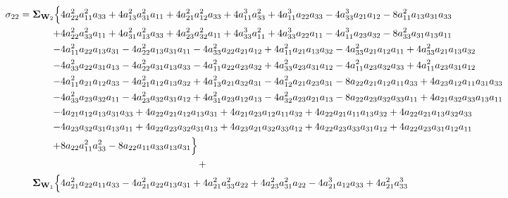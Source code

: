 \documentclass{article}
\begin{document}
\begin{equation}
\begin{aligned}
 \sigma_{22} =  \mathbf{\Sigma}_{\textbf{W}_{2}} \Bigl\{ & 4 a_{22}^{2} a_{11}^{2} a_{33} + 4 a_{13}^{2} a_{31}^{2} a_{11} + 4 a_{21}^{2} a_{12}^{2} a_{33} + 4 a_{11}^{3} a_{33}^{2} + 4 a_{11}^{3} a_{22} a_{33} - 4 a_{33}^{3} a_{21} a_{12} - 8 a_{11}^{2} a_{13} a_{31} a_{33} \\
+&4 a_{22}^{2} a_{33}^{2} a_{11} + 4 a_{31}^{2} a_{13}^{2} a_{33} + 4 a_{23}^{2} a_{32}^{2} a_{11} + 4 a_{33}^{3} a_{11}^{2} + 4 a_{33}^{3} a_{22} a_{11} - 4 a_{11}^{3} a_{23} a_{32} - 8 a_{33}^{2} a_{31} a_{13} a_{11} \\
-&4 a_{11}^{2} a_{22} a_{13} a_{31} - 4 a_{22}^{2} a_{13} a_{31} a_{11} - 4 a_{33}^{2} a_{22} a_{21} a_{12} + 4 a_{11}^{2} a_{21} a_{13} a_{32} - 4 a_{33}^{2} a_{21} a_{12} a_{11} + 4 a_{33}^{2} a_{21} a_{13} a_{32} \\
-&4 a_{33}^{2} a_{22} a_{31} a_{13} - 4 a_{22}^{2} a_{31} a_{13} a_{33} - 4 a_{11}^{2} a_{22} a_{23} a_{32} + 4 a_{33}^{2} a_{23} a_{31} a_{12} - 4 a_{11}^{2} a_{23} a_{32} a_{33} + 4 a_{11}^{2} a_{23} a_{31} a_{12} \\
-&4 a_{11}^{2} a_{21} a_{12} a_{33} - 4 a_{21}^{2} a_{12} a_{13} a_{32} + 4 a_{13}^{2} a_{21} a_{32} a_{31} - 4 a_{12}^{2} a_{21} a_{23} a_{31} - 8 a_{22} a_{21} a_{12} a_{11} a_{33} + 4 a_{23} a_{12} a_{11} a_{31} a_{33} \\
-&4 a_{33}^{2} a_{23} a_{32} a_{11} - 4 a_{23}^{2} a_{32} a_{31} a_{12} + 4 a_{31}^{2} a_{23} a_{12} a_{13} - 4 a_{32}^{2} a_{23} a_{21} a_{13} - 8 a_{22} a_{23} a_{32} a_{33} a_{11} + 4 a_{21} a_{32} a_{33} a_{13} a_{11} \\
-&4 a_{21} a_{12} a_{13} a_{31} a_{33} + 4 a_{22} a_{21} a_{12} a_{13} a_{31} +4 a_{21} a_{23} a_{12} a_{11} a_{32} + 4 a_{22} a_{21} a_{11} a_{13} a_{32} + 4 a_{22} a_{21} a_{13} a_{32} a_{33} \\
-&4 a_{23} a_{32} a_{31}a_{13} a_{11} + 4 a_{22} a_{23} a_{32} a_{31} a_{13} + 4 a_{23} a_{21} a_{32} a_{33} a_{12} + 4 a_{22} a_{23} a_{33} a_{31} a_{12} + 4 a_{22} a_{23} a_{31} a_{12} a_{11} \\
+&8 a_{22} a_{11}^{2} a_{33}^{2} - 8 a_{22} a_{11} a_{33} a_{13} a_{31}\Bigr\} \\
& \qquad \qquad \qquad \qquad \qquad \qquad \qquad + \\
\mathbf{\Sigma}_{\textbf{W}_{1}} \Bigl\{&4 a_{21}^{2} a_{22} a_{11} a_{33} - 4 a_{21}^{2} a_{22} a_{13} a_{31} + 4 a_{21}^{2} a_{33}^{2} a_{22} + 4 a_{23}^{2} a_{31}^{2} a_{22} - 4 a_{21}^{3} a_{12} a_{33} + 4 a_{21}^{2} a_{33}^{3} \\

\end{aligned}
\end{equation}
\end{document}
